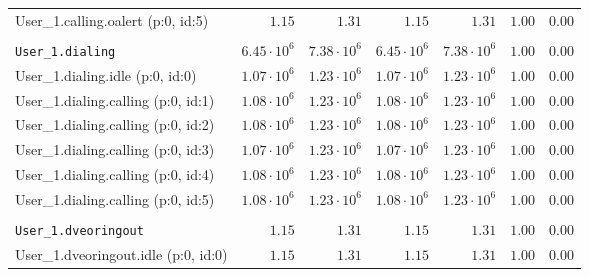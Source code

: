 \begin{table}[htbp]
{\begin{tabular}{lrrrrrr}
\hspace{3mm}User\_1.calling.oalert (p:0, id:5)        &               $1.15$ &               $1.31$ &               $1.15$ &               $1.31$ &               $1.00$ &               $0.00$ \\
\\[-8pt]\texttt{User\_1.dialing}                      &  $6.45 \cdot 10^{6}$ &  $7.38 \cdot 10^{6}$ &  $6.45 \cdot 10^{6}$ &  $7.38 \cdot 10^{6}$ &               $1.00$ &               $0.00$ \\
\hspace{3mm}User\_1.dialing.idle (p:0, id:0)          &  $1.07 \cdot 10^{6}$ &  $1.23 \cdot 10^{6}$ &  $1.07 \cdot 10^{6}$ &  $1.23 \cdot 10^{6}$ &               $1.00$ &               $0.00$ \\
\hspace{3mm}User\_1.dialing.calling (p:0, id:1)       &  $1.08 \cdot 10^{6}$ &  $1.23 \cdot 10^{6}$ &  $1.08 \cdot 10^{6}$ &  $1.23 \cdot 10^{6}$ &               $1.00$ &               $0.00$ \\
\hspace{3mm}User\_1.dialing.calling (p:0, id:2)       &  $1.08 \cdot 10^{6}$ &  $1.23 \cdot 10^{6}$ &  $1.08 \cdot 10^{6}$ &  $1.23 \cdot 10^{6}$ &               $1.00$ &               $0.00$ \\
\hspace{3mm}User\_1.dialing.calling (p:0, id:3)       &  $1.07 \cdot 10^{6}$ &  $1.23 \cdot 10^{6}$ &  $1.07 \cdot 10^{6}$ &  $1.23 \cdot 10^{6}$ &               $1.00$ &               $0.00$ \\
\hspace{3mm}User\_1.dialing.calling (p:0, id:4)       &  $1.08 \cdot 10^{6}$ &  $1.23 \cdot 10^{6}$ &  $1.08 \cdot 10^{6}$ &  $1.23 \cdot 10^{6}$ &               $1.00$ &               $0.00$ \\
\hspace{3mm}User\_1.dialing.calling (p:0, id:5)       &  $1.08 \cdot 10^{6}$ &  $1.23 \cdot 10^{6}$ &  $1.08 \cdot 10^{6}$ &  $1.23 \cdot 10^{6}$ &               $1.00$ &               $0.00$ \\
\\[-8pt]\texttt{User\_1.dveoringout}                  &               $1.15$ &               $1.31$ &               $1.15$ &               $1.31$ &               $1.00$ &               $0.00$ \\
\hspace{3mm}User\_1.dveoringout.idle (p:0, id:0)      &               $1.15$ &               $1.31$ &               $1.15$ &               $1.31$ &               $1.00$ &               $0.00$ \\

\end{tabular}}
\end{table}
